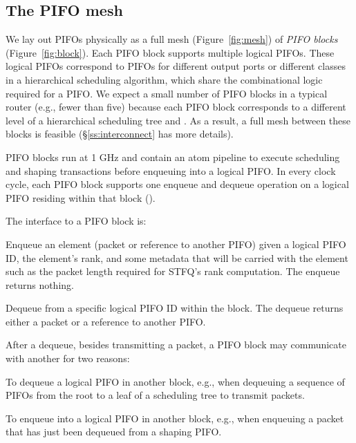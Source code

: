 \subsection{The PIFO mesh}
\label{ss:mesh}

We lay out PIFOs physically as a full mesh (Figure~\ref{fig:mesh}) of
{\em PIFO blocks} (Figure~\ref{fig:block}). Each PIFO block supports
multiple logical PIFOs. These logical PIFOs correspond to PIFOs for
different output ports or different classes in a
hierarchical scheduling algorithm, which share the combinational logic
required for a PIFO. We expect a small number of PIFO blocks in a
typical router (e.g., fewer than five) because each PIFO block
corresponds to a different level of a hierarchical scheduling tree and
. As a result, a
full mesh between these blocks is feasible (\S\ref{ss:interconnect}
has more details).

PIFO blocks run at 1 GHz and contain an atom
pipeline to execute scheduling and shaping transactions before enqueuing into a
logical PIFO. In every clock cycle, each PIFO block supports one enqueue and
dequeue operation on a logical PIFO residing within that block
().

The interface to a PIFO block is:
\begin{CompactEnumerate}
\item Enqueue an element (packet or reference to another PIFO) given a
  logical PIFO ID, the element's rank, and some metadata that will be
  carried with the element such as the packet length required for
  STFQ's rank computation. The enqueue returns nothing.
  \item Dequeue from a specific logical PIFO ID within the block. The dequeue
   returns either a packet or a reference to another PIFO.
\end{CompactEnumerate}

After a dequeue, besides transmitting a packet, a PIFO block may
communicate with another for two reasons:
 \begin{CompactEnumerate}
 \item To dequeue a logical PIFO in another block, e.g., when dequeuing a
   sequence of PIFOs from the root to a leaf of a scheduling tree to transmit
   packets.
 
 \item To enqueue into a logical PIFO in another block, e.g., when
   enqueuing a packet that has just been dequeued from a shaping
   PIFO.
 \end{CompactEnumerate}

